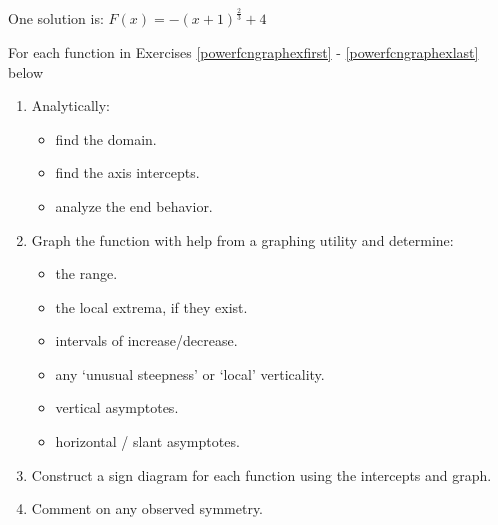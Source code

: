 \documentclass{ximera}
\begin{document}
\begin{question}
\begin{problem}
\begin{solution}
One solution is: $F(x) =-(x+1)^{\frac{2}{3}} + 4$
\end{solution}
\end{problem}
\end{question}

\begin{question}
    For each function in Exercises \ref{powerfcngraphexfirst} - \ref{powerfcngraphexlast} below 

\begin{enumerate}

\item Analytically:

\begin{itemize}

\item find the domain.

\item find the axis intercepts.

\item analyze the end behavior.

\end{itemize}



\item Graph the function with help from a graphing utility and determine:


\begin{itemize}

\item  the range.

\item the local extrema, if they exist.

\item intervals of increase/decrease.

\item any `unusual steepness' or `local' verticality.

\item  vertical asymptotes.

\item  horizontal / slant asymptotes.

\end{itemize}

\item Construct a sign diagram for each function using the intercepts and graph.

\item  Comment on any observed symmetry.


\end{enumerate}
\end{question}
\end{document}
